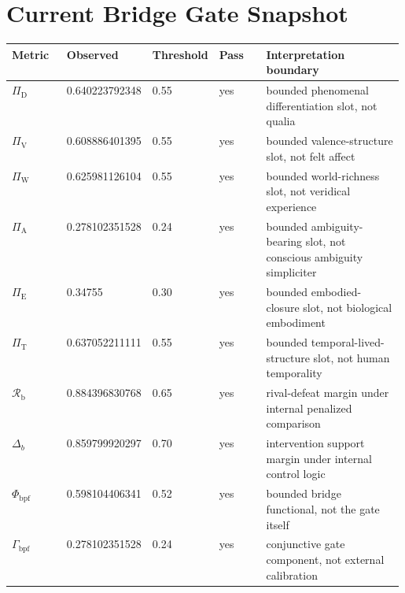 \documentclass[11pt,a4paper]{article}
\theoremstyle{definition}
\newcommand{\PiD}{\Pi_{\mathrm{D}}}
\newcommand{\PiV}{\Pi_{\mathrm{V}}}
\newcommand{\PiW}{\Pi_{\mathrm{W}}}
\newcommand{\PiA}{\Pi_{\mathrm{A}}}
\newcommand{\PiE}{\Pi_{\mathrm{E}}}
\newcommand{\PiT}{\Pi_{\mathrm{T}}}
\newcommand{\PhiBridge}{\Phi_{\mathrm{bpf}}}
\newcommand{\BridgeMargin}{\mathcal{R}_{\mathrm{b}}}
\begin{document}
\section{Current Bridge Gate Snapshot}
\begin{center}
\small
\begin{tabularx}{\linewidth}{@{}p{0.14\linewidth}p{0.16\linewidth}p{0.16\linewidth}p{0.12\linewidth}Y@{}}
\toprule
Metric & Observed & Threshold & Pass & Interpretation boundary \\
\midrule
$\PiD$ & 0.640223792348 & 0.55 & yes & bounded phenomenal differentiation slot, not qualia \\
$\PiV$ & 0.608886401395 & 0.55 & yes & bounded valence-structure slot, not felt affect \\
$\PiW$ & 0.625981126104 & 0.55 & yes & bounded world-richness slot, not veridical experience \\
$\PiA$ & 0.278102351528 & 0.24 & yes & bounded ambiguity-bearing slot, not conscious ambiguity simpliciter \\
$\PiE$ & 0.34755 & 0.30 & yes & bounded embodied-closure slot, not biological embodiment \\
$\PiT$ & 0.637052211111 & 0.55 & yes & bounded temporal-lived-structure slot, not human temporality \\
$\BridgeMargin$ & 0.884396830768 & 0.65 & yes & rival-defeat margin under internal penalized comparison \\
$\Delta_b$ & 0.859799920297 & 0.70 & yes & intervention support margin under internal control logic \\
$\PhiBridge$ & 0.598104406341 & 0.52 & yes & bounded bridge functional, not the gate itself \\
$\Gamma_{\mathrm{bpf}}$ & 0.278102351528 & 0.24 & yes & conjunctive gate component, not external calibration \\
\bottomrule
\end{tabularx}
\normalsize
\end{center}
\end{document}
